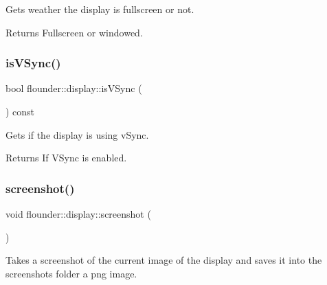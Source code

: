 Gets weather the display is fullscreen or not. 

\begin{DoxyReturn}{Returns}
Fullscreen or windowed. 
\end{DoxyReturn}
\mbox{\label{classflounder_1_1display_a856cee2cfd9d3640134001ab81585701}} 
\subsubsection{\texorpdfstring{is\+V\+Sync()}{isVSync()}}
{\footnotesize\ttfamily bool flounder\+::display\+::is\+V\+Sync (\begin{DoxyParamCaption}{ }\end{DoxyParamCaption}) const\hspace{0.3cm}{\ttfamily [inline]}}



Gets if the display is using v\+Sync. 

\begin{DoxyReturn}{Returns}
If V\+Sync is enabled. 
\end{DoxyReturn}
\mbox{\label{classflounder_1_1display_af27b3f93977c32c79ad9522672e484c5}} 
\subsubsection{\texorpdfstring{screenshot()}{screenshot()}}
{\footnotesize\ttfamily void flounder\+::display\+::screenshot (\begin{DoxyParamCaption}{ }\end{DoxyParamCaption})}



Takes a screenshot of the current image of the display and saves it into the screenshots folder a png image. 

\mbox{\label{classflounder_1_1display_ae9a340bfa09dfd6d08ebc0d21b4c77b0}} 
